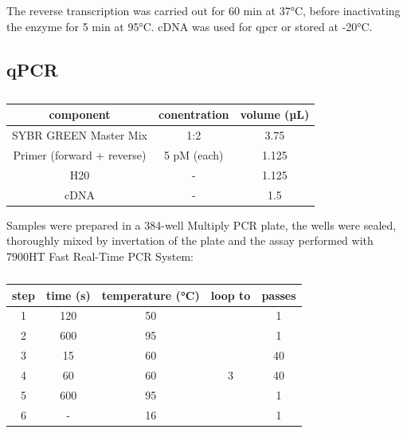     The reverse transcription was carried out for 60 min at 37°C, before inactivating the enzyme for 5 min at 95°C. cDNA was used for \ac{qpcr} or stored at -20°C.

    \subsection{qPCR}
    \begin{table}[h]
    \capstart
	\centering
	\begin{minipage}{\captionwidth}
	   	\caption[qPCR samples]{}
	   	\label{tab:qPCR_samples}
	\end{minipage}
    \begin{tabular}{|c|c|c|}
        \hline
        component                  & conentration & volume (µL) \\ \hline
        SYBR GREEN Master Mix      & 1:2          & 3.75        \\
        Primer (forward + reverse) & 5 pM (each)  & 1.125       \\
        H20                        & -            & 1.125       \\
        cDNA                       & -            & 1.5           \\ \hline
    \end{tabular}
    \end{table}
    Samples were prepared in a 384-well Multiply PCR plate, the wells were sealed, thoroughly mixed by invertation of the plate and the assay performed with 7900HT Fast Real-Time PCR System:

    \begin{table}[h]
    \capstart
    \centering
    \begin{minipage}{\captionwidth}
        \caption[qPCR programme]{}
        \label{tab:qPCR_programme}
    \end{minipage}
    \begin{tabular}{|c|c|c|c|c|}
    \hline
        step & time (s) & temperature (°C) & loop to & passes \\ \hline
        1    & 120      & 50               &         & 1      \\
        2    & 600      & 95               &         & 1      \\
        3    & 15       & 60               &         & 40     \\
        4    & 60       & 60               & 3       & 40     \\
        5    & 600      & 95               &         & 1      \\
        6    & -        & 16               &         & 1      \\ \hline
    \end{tabular}
    \end{table}

